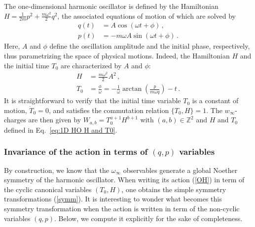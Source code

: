 \documentclass[onecolumn,notitlepage,superscriptaddress, nofootinbib,nobibnotes, aps,prd,10pt]{revtex4-1}%
\begin{document}
The one-dimensional harmonic oscillator is defined by the Hamiltonian $H = \frac{1}{2m}p^2+\frac{m\omega^2}{2}q^2$, the associated equations of motion of which are solved by
%
\begin{subequations}
\begin{align}
    q(t) &= A\cos(\omega t+\phi)\, ,\\[7pt]
    p(t) &= -m\omega A\sin(\omega t +\phi)\, .
\end{align}
\end{subequations}
%
Here, $A$ and $\phi$ define the oscillation amplitude and the initial phase, respectively, thus parametrizing the space of physical motions. Indeed, the Hamiltonian $H$ and the initial time $T_0$ are characterized by $A$ and $\phi$:
%
\begin{subequations}\label{eq:1D HO H and T0}
\begin{align}
    H &= \frac{m\omega^2}{2}A^2\, ,\\[7pt]
    T_0 &=\frac{ \phi}{\omega} = -\frac{1}{\omega}\arctan\left(\frac{p}{m\omega q}\right) -t\, .
\end{align}
\end{subequations}
%
It is straightforward to verify that the initial time variable $T_0$ is a constant of motion, $\dot{T}_0 = 0$, and satisfies the commutation relation $\{T_0,H\} = 1$. The $w_\infty$-charges are then given by $W_{a,b} = T_0^{a+1}H^{b+1}$ with $(a,b)\in\mathbb{Z}^2$ and $H$ and $T_0$ defined in Eq.~\eqref{eq:1D HO H and T0}.  

\subsubsection{Invariance of the action in terms of $(q,p)$ variables }

\label{OHflow}
By construction, we know that the $\omega_{\infty}$ observables generate a global Noether symmetry of the harmonic oscillator. When writing its action (\ref{OH}) in term of the cyclic canonical variables $(T_0, H)$, one obtains the simple symmetry transformations (\ref{symm}).
It is interesting to wonder what becomes this symmetry transformation when the action is written in term of the non-cyclic variables $(q,p)$. Below, we compute it explicitly for the sake of completeness. 
\end{document}
